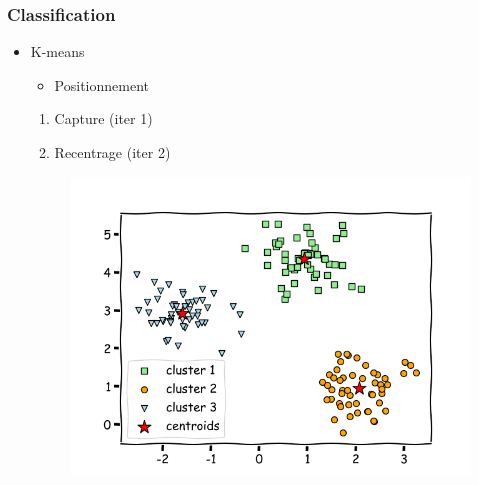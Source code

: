 \begin{frame}\frametitle{Classification}
   \begin{itemize}
      \item K-means
      \begin{itemize}
         \item Positionnement
      \end{itemize}
      \begin{enumerate}
         \item Capture (iter 1)
         \item Recentrage (iter 2)
      \end{enumerate}
      \begin{figure}[H]
         \includegraphics[scale=.35]{../images/illustrations/model_kmeans.png}
      \end{figure}
   \end{itemize}
\end{frame}


